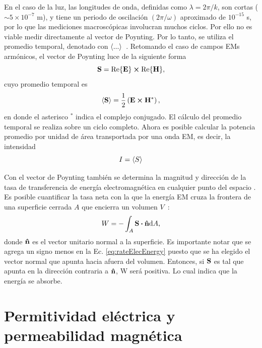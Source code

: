En el caso de la luz, las longitudes de onda, definidas como $\lambda=2\pi/k$, son cortas ($\sim 5\times10^{-7}$ m), y tiene un periodo de oscilación $(2\pi/\omega)$ aproximado de $10^{-15}$ s, por lo que las mediciones macroscópicas involucran muchos ciclos. Por ello no es viable medir directamente al vector de Poynting. Por lo tanto, se utiliza el promedio temporal, denotado con $\expval{...}$~\cite{griffiths2013electrodynamics}. Retomando el caso de campos EMs armónicos, el vector de Poynting luce de la siguiente forma
\begin{equation}
\vb{S} = \Re{\vb{E}} \cross \Re{\vb{H}},
\end{equation}
cuyo promedio temporal es~\cite{born2005principles}
\begin{equation}
\expval{\vb{S}}=\frac{1}{2}\left(\vb{E} \cross \vb{H}^{*}\right),
\label{eq:poynting_promedio}
\end{equation}
en donde el asterisco $^{*}$ indica el complejo conjugado. El cálculo del promedio temporal se realiza sobre un ciclo completo. Ahora es posible calcular la potencia promedio por unidad de área transportada por una onda EM, es decir, la intensidad~\cite{griffiths2013electrodynamics}
\begin{equation}
I=\expval{S}
\end{equation}

Con el vector de Poynting también se determina la magnitud y dirección de la tasa de transferencia de energía electromagnética en cualquier punto del espacio \cite{bohren1998absorption}. Es posible cuantificar la tasa neta con la que la energía EM cruza la frontera de una superficie cerrada $A$ que encierra un volumen $V$~\cite{bohren1998absorption}:
\begin{equation}
W=- \int_{A} \vb{S} \vdot \vu{n} \dd A,
\label{eq:rateElecEnergy}
\end{equation}
donde $\vu{n}$ es el vector unitario normal a la superficie. Es importante notar que se agrega un signo menos en la Ec. \eqref{eq:rateElecEnergy} puesto que se ha elegido el vector normal que apunta hacia afuera del volumen. Entonces, si $\vb{S}$ es tal que apunta en la dirección contraria a $\vu{n}$, W será positiva. Lo cual indica que la energía se absorbe. 

\section{Permitividad eléctrica y permeabilidad magnética}

